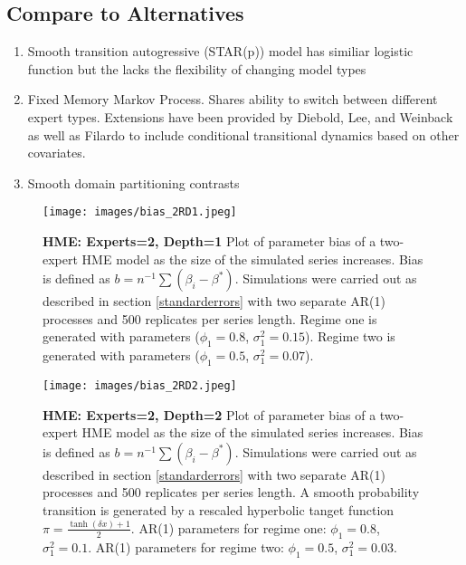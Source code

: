 \documentclass[12pt]{article}
\begin{document}
\subsection{Compare to Alternatives}
\begin{enumerate}
\item Smooth transition autogressive (STAR(p)) model has similiar logistic function but the lacks the flexibility of changing model types
\item Fixed Memory Markov Process. Shares ability to switch between different expert types. Extensions have been provided by Diebold, Lee, and Weinback \cite{DieboldLeeWeinbach} as well as Filardo \cite{Filardo} to include conditional transitional dynamics based on other covariates.
\item Smooth domain partitioning contrasts
\end{enumerate}
\begin{figure}[ht]
  \centering
  \texttt{[image: images/bias\_2RD1.jpeg]}
  \caption{\textbf{HME: Experts=2, Depth=1} Plot of parameter bias of a two-expert HME model as the size of the simulated series increases. Bias is defined as $b=n^{-1}\textstyle{\sum}(\beta_{i}-\beta^{*})$. Simulations were carried out as described in section \ref{standarderrors} with two separate AR(1) processes and 500 replicates per series length. Regime one is generated with parameters ($\phi_{1}=0.8$, $\sigma^{2}_{1}=0.15$). Regime two is generated with parameters ($\phi_{1}=0.5$, $\sigma^{2}_{1}=0.07$).}
  \label{fig:bias_2RD1}
\end{figure}

\begin{figure}[ht]
  \centering
  \texttt{[image: images/bias\_2RD2.jpeg]}
  \caption{\textbf{HME: Experts=2, Depth=2} Plot of parameter bias of a two-expert HME model as the size of the simulated series increases. Bias is defined as $b=n^{-1}\textstyle{\sum}(\beta_{i}-\beta^{*})$. Simulations were carried out as described in section \ref{standarderrors} with two separate AR(1) processes and 500 replicates per series length. A smooth probability transition is generated by a rescaled hyperbolic tanget function $\pi=\frac{\tanh(\delta x) + 1}{2}$. AR(1) parameters for regime one: $\phi_{1}=0.8$, $\sigma^{2}_{1}=0.1$. AR(1) parameters for regime two: $\phi_{1}=0.5$, $\sigma^{2}_{1}=0.03$.}
  \label{fig:bias_2RD2}
\end{figure}






\end{document}
